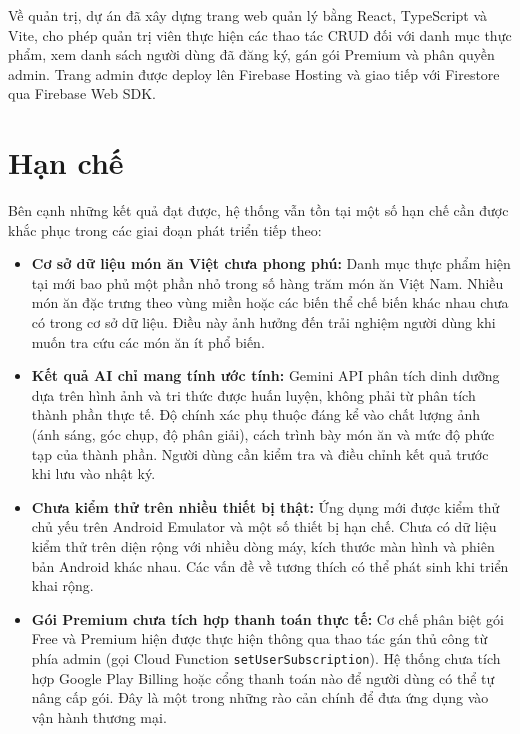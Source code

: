 Về quản trị, dự án đã xây dựng trang web quản lý bằng React, TypeScript và Vite, cho phép quản trị viên thực hiện các thao tác CRUD đối với danh mục thực phẩm, xem danh sách người dùng đã đăng ký, gán gói Premium và phân quyền admin. Trang admin được deploy lên Firebase Hosting và giao tiếp với Firestore qua Firebase Web SDK.

\section*{Hạn chế}

Bên cạnh những kết quả đạt được, hệ thống vẫn tồn tại một số hạn chế cần được khắc phục trong các giai đoạn phát triển tiếp theo:

\begin{itemize}
    \item \textbf{Cơ sở dữ liệu món ăn Việt chưa phong phú:} Danh mục thực phẩm hiện tại mới bao phủ một phần nhỏ trong số hàng trăm món ăn Việt Nam. Nhiều món ăn đặc trưng theo vùng miền hoặc các biến thể chế biến khác nhau chưa có trong cơ sở dữ liệu. Điều này ảnh hưởng đến trải nghiệm người dùng khi muốn tra cứu các món ăn ít phổ biến.

    \item \textbf{Kết quả AI chỉ mang tính ước tính:} Gemini API phân tích dinh dưỡng dựa trên hình ảnh và tri thức được huấn luyện, không phải từ phân tích thành phần thực tế. Độ chính xác phụ thuộc đáng kể vào chất lượng ảnh (ánh sáng, góc chụp, độ phân giải), cách trình bày món ăn và mức độ phức tạp của thành phần. Người dùng cần kiểm tra và điều chỉnh kết quả trước khi lưu vào nhật ký.

    \item \textbf{Chưa kiểm thử trên nhiều thiết bị thật:} Ứng dụng mới được kiểm thử chủ yếu trên Android Emulator và một số thiết bị hạn chế. Chưa có dữ liệu kiểm thử trên diện rộng với nhiều dòng máy, kích thước màn hình và phiên bản Android khác nhau. Các vấn đề về tương thích có thể phát sinh khi triển khai rộng.

    \item \textbf{Gói Premium chưa tích hợp thanh toán thực tế:} Cơ chế phân biệt gói Free và Premium hiện được thực hiện thông qua thao tác gán thủ công từ phía admin (gọi Cloud Function \texttt{setUserSubscription}). Hệ thống chưa tích hợp Google Play Billing hoặc cổng thanh toán nào để người dùng có thể tự nâng cấp gói. Đây là một trong những rào cản chính để đưa ứng dụng vào vận hành thương mại.
\end{itemize}

